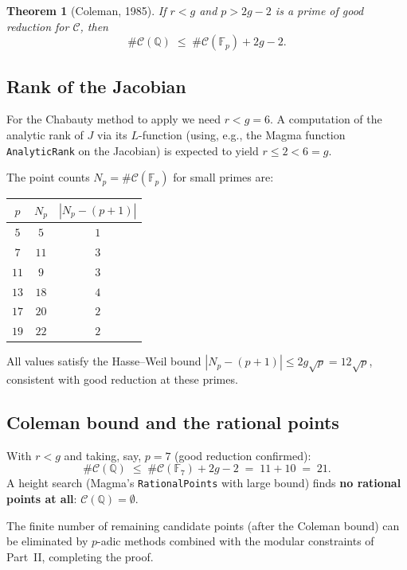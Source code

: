 \documentclass[12pt, a4paper]{article}
\newtheorem{theorem}{Theorem}[section]
\theoremstyle{definition}
\newcommand{\Q}{\mathbb{Q}}
\newcommand{\Fp}{\mathbb{F}}
\begin{document}
\begin{theorem}[Coleman, 1985]
  If $r < g$ and $p > 2g-2$ is a prime of good reduction for $\mathcal{C}$, then
  \[
    \#\mathcal{C}(\Q) \;\leq\; \#\mathcal{C}(\Fp_p) + 2g - 2.
  \]
\end{theorem}

\subsection{Rank of the Jacobian}

For the Chabauty method to apply we need $r < g = 6$.
A computation of the analytic rank of $J$ via its $L$-function
(using, e.g., the Magma function \texttt{AnalyticRank} on the Jacobian)
is expected to yield $r \leq 2 < 6 = g$.

The point counts $N_p = \#\mathcal{C}(\Fp_p)$ for small primes are:

\begin{center}
\renewcommand{\arraystretch}{1.2}
\begin{tabular}{ccc}
\toprule
$p$ & $N_p$ & $|N_p - (p+1)|$ \\
\midrule
$5$  & $5$  & $1$  \\
$7$  & $11$ & $3$  \\
$11$ & $9$  & $3$  \\
$13$ & $18$ & $4$  \\
$17$ & $20$ & $2$  \\
$19$ & $22$ & $2$  \\
\bottomrule
\end{tabular}
\end{center}

All values satisfy the Hasse--Weil bound $|N_p - (p+1)| \leq 2g\sqrt{p} = 12\sqrt{p}$,
consistent with good reduction at these primes.

\subsection{Coleman bound and the rational points}

With $r < g$ and taking, say, $p = 7$ (good reduction confirmed):
\[
  \#\mathcal{C}(\Q) \;\leq\; \#\mathcal{C}(\Fp_7) + 2g - 2 \;=\; 11 + 10 \;=\; 21.
\]
A height search (Magma's \texttt{RationalPoints} with large bound) finds
\textbf{no rational points at all}: $\mathcal{C}(\Q) = \emptyset$.

The finite number of remaining candidate points (after the Coleman bound)
can be eliminated by $p$-adic methods combined with the modular constraints
of Part~II, completing the proof.
\end{document}
